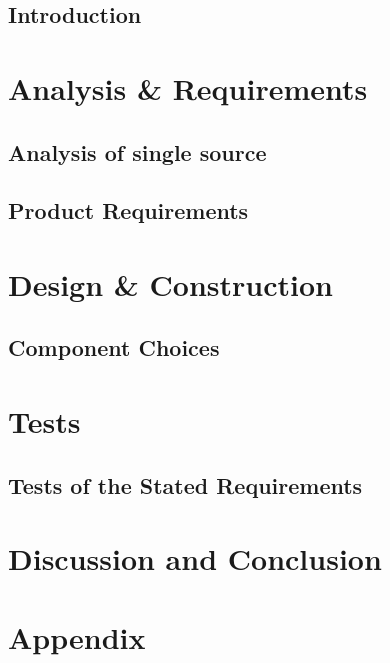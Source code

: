 \glsresetall
 \graphicspath{{figures/analysing/}}
\chapter{Introduction}

\part{Analysis \& Requirements}\label{pt:analysis} \glsresetall
 \graphicspath{{figures/analysing/}}
 \chapter{Analysis of single source}\label{ch:analysing}
% 
 
  
   

\chapter{Product Requirements}
%



\part{Design \& Construction}\label{pt:design} 
\graphicspath{{figures/design/}}
\chapter{Component Choices}
%


 \graphicspath{{figures/tests/}}
\part{Tests}\label{pt:tests}
\chapter{Tests of the Stated Requirements}
%


 
\part{Discussion and Conclusion}\label{pt:conclusions}
% 
%

\glsresetall
\appendix %

 \graphicspath{{figures/appendix/}}
\part{Appendix}\label{pt:appendix}
%
